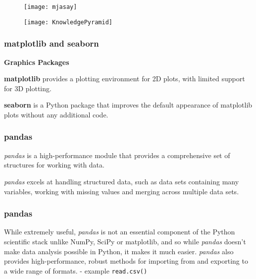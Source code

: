  
 \begin{figure}
  \centering
  \texttt{[image: mjasay]}
  
 \end{figure}
 
 
 
 \begin{figure}
  \centering
  \texttt{[image: KnowledgePyramid]}
  
 \end{figure}
 
 


 
\frametitle{matplotlib and seaborn}
 
 \vspace{-0.4cm}
\textbf{Graphics Packages}
 
\item \textbf{matplotlib} provides a plotting environment for 2D plots, with limited support for 3D plotting. 
\item \textbf{seaborn} is
a Python package that improves the default appearance of matplotlib plots without any additional code.
 

 
 
\frametitle{pandas}
 
 
\item  \textit{pandas} is a high-performance module that provides a comprehensive set of structures for working with
data. 
\item \textit{pandas} excels at handling structured data, such as data sets containing many variables, working with
missing values and merging across multiple data sets. 
 
 

 
  
 \frametitle{pandas} 
  
  
 
  While extremely useful, \textit{pandas} is not an essential component of the Python scientific stack unlike NumPy, SciPy or matplotlib, and so while \textit{pandas} doesn’t
 make data analysis possible in Python, it makes it much easier.  \textit{pandas} also provides high-performance,
 robust methods for importing from and exporting to a wide range of formats.
  - example \texttt{read.csv()}
  
 
 


 